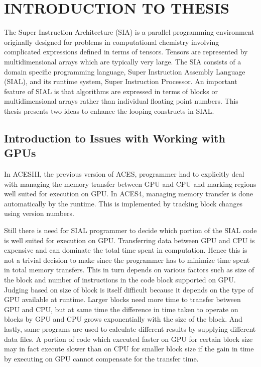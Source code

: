 \chapter{INTRODUCTION TO THESIS}\label{intro}
The Super Instruction Architecture (SIA) is a parallel programming environment
originally designed for problems in computational chemistry involving complicated
expressions defined in terms of tensors. Tensors are represented by
multidimensional arrays which are typically very large. The SIA consists of a
domain specific programming language, Super Instruction Assembly Language
(SIAL), and its runtime system, Super Instruction Processor. An important
feature of SIAL is that algorithms are expressed in terms of blocks or
multidimensional arrays rather than individual floating point numbers. This thesis
presents two ideas to enhance the looping constructs in SIAL.

\section{Introduction to Issues with Working with GPUs}
In ACESIII, the previous version of ACES, programmer had to explicitly deal with managing
the memory transfer between GPU and CPU and marking regions well suited for execution
on GPU. In ACES4, managing memory transfer is done automatically by the runtime.
This is implemented by tracking block changes using version numbers.

Still there is need for SIAL programmer to decide which portion of the SIAL code
is well suited for execution on GPU. Transferring data between GPU and CPU is
expensive and can dominate the total time spent in computation. Hence this is not
a trivial decision to make since the programmer has to minimize time spent in
total memory transfers. This in turn depends on various factors such as
size of the block and number of instructions in the code block supported on GPU. Judging
based on size of block is itself difficult because it depends on the type of GPU available
at runtime. Larger blocks need more time to transfer between GPU and CPU, but at
same time the difference in time taken to operate on blocks by GPU and CPU grows
exponentially with the size of the block. And lastly, same programs are used to
calculate different results by supplying different data files. A portion of code
which executed faster on GPU for certain block size may in fact execute slower
than on CPU for smaller block size if the gain in time by executing on GPU cannot
compensate for the transfer time.

